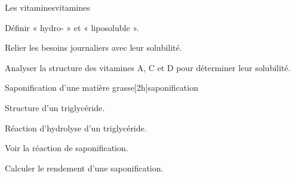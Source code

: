 \begin{multicols}{2}
  \begin{activite}{Les vitamines}{vitamines}
    \begin{objectifs}
      \item Définir « hydro- » et « liposoluble ».
      \item Relier les besoins journaliers avec leur solubilité.
      \item Analyser la structure des vitamines A, C et D pour déterminer leur solubilité.
    \end{objectifs}
  \end{activite}
  
  \begin{TP}{Saponification d'une matière grasse}[2h]{saponification}
    \begin{prerequis}
      \item Structure d'un triglycéride.
      \item Réaction d'hydrolyse d'un triglycéride.
    \end{prerequis}
    \begin{objectifs}
      \item Voir la réaction de saponification.
      \item Calculer le rendement d'une saponification.
    \end{objectifs}
  \end{TP}  
\end{multicols}


\vspace*{-2cm}



\newpage
\nomPrenomClasse
{}
\vspace*{24pt}

\vspace*{-12.8 cm}

\begin{programmeSeance}
\end{programmeSeance}
\vspace*{1.2 cm}

